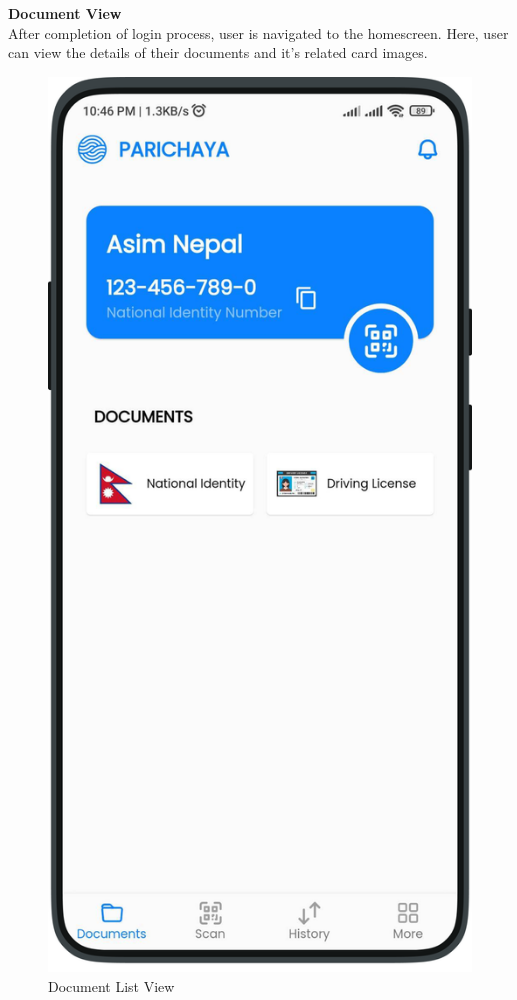 \textbf{Document View}\\
After completion of login process, user is navigated to the homescreen. Here, user can view the details of their documents and it's related card images.
\begin{multicols}{2}
    \begin{figure}[H]
        \centering
        \includegraphics[width=0.6\linewidth]{images/results/mobile/Home.png}
        \caption[Document List View]{Document List View}
        \label{fig:Home.png}
        \end{figure} 
    \begin{figure}[H]
        \centering

\end{figure}
\end{multicols}
